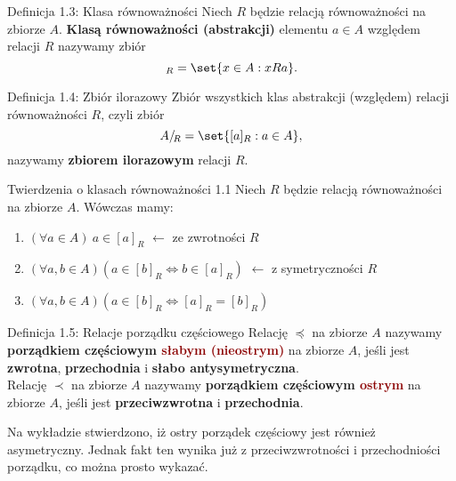 \documentclass{article}
\newcommand{\ifff}{\Leftrightarrow}
\newcommand{\ilorazowy}[1]{#1/\!{_R}}
\DeclarePairedDelimiter\set\{\}
\begin{document}
\begin{defr}{Definicja 1.3: Klasa równoważności}
    Niech $R$ będzie relacją równoważności na zbiorze $A$.\textbf{ Klasą równoważności (abstrakcji)} elementu $a\in A$ względem
    relacji $R$ nazywamy zbiór
    \begin{equation*}
        [a]_R=\set{x\in A:xRa}.
    \end{equation*}
\end{defr}

\begin{defr}{Definicja 1.4: Zbiór ilorazowy}
    Zbiór wszystkich klas abstrakcji (względem) relacji równoważności $R$, czyli zbiór
    \begin{equation*}
        \ilorazowy{A}=\set{[a]_R:a\in A},
    \end{equation*}
    nazywamy \textbf{zbiorem ilorazowym} relacji $R$.
\end{defr}

\begin{twier}{Twierdzenia o klasach równoważności 1.1}
    Niech $R$ będzie relacją równoważności na zbiorze $A$. Wówczas mamy:
    \begin{enumerate}[label=(\roman*)]
        \item $(\forall a\in A)\ a\in [a]_R$ $\leftarrow$ ze zwrotności $R$
        \item $(\forall a,b\in A)(a\in [b]_R\ifff b\in [a]_R)$ $\leftarrow$ z symetryczności $R$
        \item $(\forall a,b\in A)(a\in [b]_R\ifff [a]_R=[b]_R)$
    \end{enumerate}
\end{twier}

\begin{defr}{Definicja 1.5: Relacje porządku częściowego}
    Relację $\preceq$ na zbiorze $A$ nazywamy \textbf{porządkiem częściowym 
    \textcolor{darkred}{słabym (nieostrym)}} na zbiorze $A$, jeśli jest \textbf{zwrotna},
    \textbf{przechodnia} i \textbf{słabo antysymetryczna}. \\ \smallskip
    Relację $\prec$ na zbiorze $A$ nazywamy \textbf{porządkiem częściowym \textcolor{darkred}{ostrym}} na
    zbiorze $A$, jeśli jest \textbf{przeciwzwrotna} i \textbf{przechodnia}.
\end{defr}

Na wykładzie stwierdzono, iż ostry porządek częściowy jest również asymetryczny. Jednak fakt ten wynika
już z przeciwzwrotności i przechodniości porządku, co można prosto wykazać.
\end{document}
